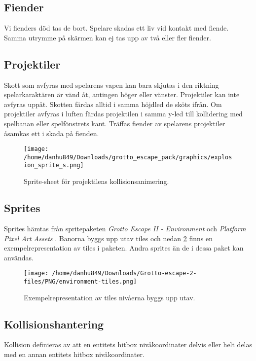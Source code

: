 \documentclass{TDP005mall}
\begin{document}
\subsection{Fiender}
Vi fienders död tas de bort. Spelare skadas ett liv vid kontakt med fiende. Samma utrymme på skärmen kan ej tas upp av två eller fler fiender.
\newpage
\subsection{Projektiler}
Skott som avfyras med spelarens vapen kan bara skjutas i den riktning spelarkaraktären är vänd åt, antingen höger eller vänster. Projektiler kan inte avfyras uppåt. Skotten färdas alltid i samma höjdled de sköts ifrån. Om projektiler avfyras i luften färdas projektilen i samma y-led till kollidering med spelbanan eller spelfönstrets kant. Träffas fiender av spelarens projektiler åsamkas ett i skada på fienden.

\begin{figure}[h!]
  \texttt{[image: /home/danhu849/Downloads/grotto\_escape\_pack/graphics/explosion\_sprite\_s.png]}
  \caption{Sprite-sheet för projektilens kollisionsanimering.\label{fig:6}}
\end{figure}

\subsection{Sprites}
Sprites hämtas från spritepaketen \emph{Grotto Escape II - Environment} \textcite{grotto2} och \emph{Platform Pixel Art Assets} \textcite{grotto1}. Banorna byggs upp utav tiles och nedan \ref{fig:a} finns en exempelrepresentation av tiles i paketen. Andra sprites än de i dessa paket kan användas.

\begin{figure}[h!]
  \texttt{[image: /home/danhu849/Downloads/Grotto-escape-2-files/PNG/environment-tiles.png]}
  \caption{Exempelrepresentation av tiles nivåerna byggs upp utav.\label{fig:a}}
\end{figure}

\subsection{Kollisionshantering} %
Kollision definieras av att en entitets hitbox nivåkoordinater delvis eller helt delas med en annan entitets hitbox nivåkoordinater.
\end{document}
